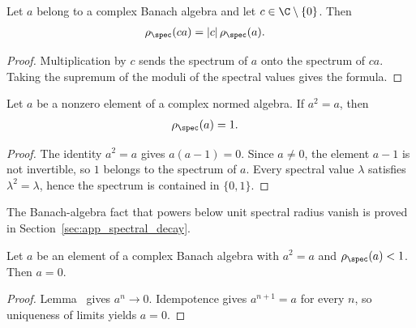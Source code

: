 \begin{lemma}%
    \label{thm:spectral_radius_smul}
    \leanok
    Let $a$ belong to a complex Banach algebra and let $c\in\C\setminus\{0\}$.
    Then
    \begin{align}
        \rho_{\spec}(ca) & =|c|\,\rho_{\spec}(a).
        \notag
    \end{align}
\end{lemma}

\begin{proof}\leanok
    Multiplication by $c$ sends the spectrum of $a$ onto the spectrum of
    $ca$. Taking the supremum of the moduli of the spectral values gives the
    formula.
\end{proof}

\begin{lemma}%
    \label{thm:idempotent_spectral_radius_one}
    \leanok
    Let $a$ be a nonzero element of a complex normed algebra. If $a^2=a$, then
    \begin{align}
        \rho_{\spec}(a) & =1.
        \notag
    \end{align}
\end{lemma}

\begin{proof}\leanok
    The identity $a^2=a$ gives $a(a-1)=0$. Since $a\ne0$, the element $a-1$
    is not invertible, so $1$ belongs to the spectrum of $a$. Every spectral
    value $\lambda$ satisfies $\lambda^2=\lambda$, hence the spectrum is
    contained in $\{0,1\}$.
\end{proof}

The Banach-algebra fact that powers below unit spectral radius vanish is
proved in Section~\ref{sec:app_spectral_decay}.

\begin{lemma}%
    \label{lem:idempotent_spectral_radius_zero}
    \leanok
    Let $a$ be an element of a complex Banach algebra with $a^2=a$ and
    $\rho_{\spec}(a)<1$. Then $a=0$.
\end{lemma}

\begin{proof}
    \leanok

    Lemma~\cite[``Powers vanish below unit spectral radius'']{QICLean2026Blueprint} gives $a^n\to0$.
    Idempotence gives $a^{n+1}=a$ for every $n$, so uniqueness of limits
    yields $a=0$.
\end{proof}

